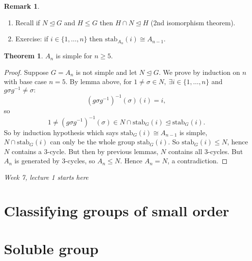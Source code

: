 \documentclass[a4paper]{article}
\newcommand{\stab}{\text{stab}}
\theoremstyle{definition}
\newtheorem{thm}[defn]{Theorem}
\newtheorem*{remark}{Remark}
\begin{document}
\begin{remark}
\begin{enumerate}
\item Recall if $N\unlhd G$ and $H\leq G$ then $H\cap N\unlhd H$ (2nd isomorphism theorem).
\item Exercise: if $i\in\{1,\ldots,n\}$ then $\stab_{A_n}(i)\cong A_{n-1}$.
\end{enumerate}
\end{remark}

\begin{thm}
$A_n$ is simple for $n\geq 5$.
\end{thm}
\begin{proof}
Suppose $G=A_n$ is not simple and let $N\unlhd G$. We prove by induction on $n$ with base case $n=5$. By lemma above, for $1\neq \sigma\in N,\ \exists i\in\{1,\ldots,n\}$ and $g\sigma g^{-1}\neq \sigma:$
\[
\left(g\sigma g^{-1}\right)^{-1} (\sigma) (i)=i,
\]
so
\[
1\neq \left(g\sigma g^{-1}\right)^{-1} (\sigma) \in N\cap \stab_G(i) \unlhd \stab_G(i).
\]
So by induction hypothesis which says $\stab_G(i)\cong A_{n-1}$ is simple, $N\cap \stab_G(i)$ can only be the whole group $\stab_G(i)$. So $\stab_G(i)\leq N$, hence $N$ contains a 3-cycle. But then by previous lemmas, $N$ contains all 3-cycles. But $A_n$ is generated by 3-cycles, so $A_n\leq N$. Hence $A_n=N$, a contradiction.
\end{proof}

\begin{flushright}
\textit{Week 7, lecture 1 starts here}
\end{flushright}

\section{Classifying groups of small order}

\section{Soluble group}
\end{document}
